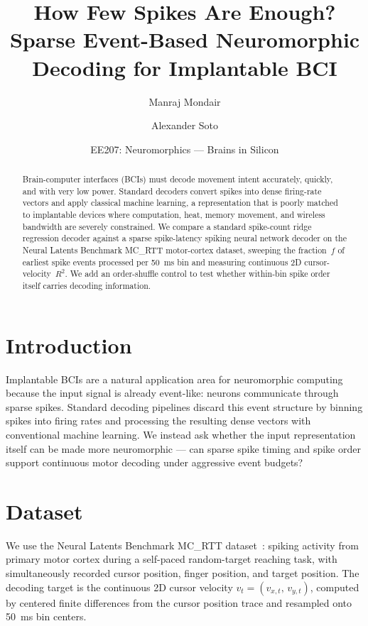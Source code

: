 \documentclass[11pt]{article}
\title{How Few Spikes Are Enough?\\
       Sparse Event-Based Neuromorphic Decoding for Implantable BCI}
\author{Manraj Mondair \and Alexander Soto}
\date{EE207: Neuromorphics — Brains in Silicon}
\begin{document}
\maketitle

\begin{abstract}
Brain-computer interfaces (BCIs) must decode movement intent accurately,
quickly, and with very low power. Standard decoders convert spikes into
dense firing-rate vectors and apply classical machine learning, a
representation that is poorly matched to implantable devices where
computation, heat, memory movement, and wireless bandwidth are severely
constrained. We compare a standard spike-count ridge regression decoder
against a sparse spike-latency spiking neural network decoder on the
Neural Latents Benchmark MC\_RTT motor-cortex dataset, sweeping the
fraction~$f$ of earliest spike events processed per 50~ms bin and
measuring continuous 2D cursor-velocity~$R^2$. We add an order-shuffle
control to test whether within-bin spike order itself carries decoding
information.

\end{abstract}

\section{Introduction}
Implantable BCIs are a natural application area for neuromorphic
computing because the input signal is already event-like: neurons
communicate through sparse spikes. Standard decoding pipelines discard
this event structure by binning spikes into firing rates and processing
the resulting dense vectors with conventional machine learning. We
instead ask whether the input representation itself can be made more
neuromorphic --- can sparse spike timing and spike order support
continuous motor decoding under aggressive event budgets?

\section{Dataset}
We use the Neural Latents Benchmark MC\_RTT
dataset~\cite{nlb2021}: spiking activity from primary motor cortex
during a self-paced random-target reaching task, with simultaneously
recorded cursor position, finger position, and target position. The
decoding target is the continuous 2D cursor velocity
$v_t = (v_{x,t},\, v_{y,t})$, computed by centered finite differences
from the cursor position trace and resampled onto 50~ms bin centers.
\end{document}
